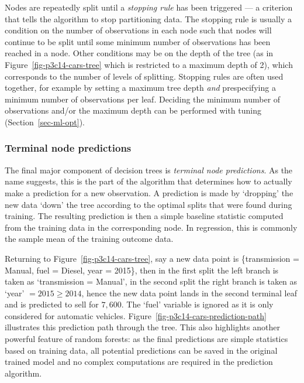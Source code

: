\documentclass[
  letterpaper,
  krantz2]{style/krantz}
\begin{document}
Nodes are repeatedly split until a \emph{stopping rule} has been
triggered --- a criterion that tells the algorithm to stop partitioning
data. The stopping rule is usually a
condition on the number of observations in each node such that nodes
will continue to be split until some minimum number of observations has
been reached in a node. Other conditions may be on the depth of the tree
(as in Figure~\ref{fig-p3c14-cars-tree} which is restricted to a maximum
depth of 2), which corresponds to the number of levels of
splitting. Stopping
rules are often used together, for example by setting a maximum tree
depth \emph{and} prespecifying a minimum number of observations per
leaf. Deciding the minimum number of observations and/or the maximum
depth can be performed with tuning (Section~\ref{sec-ml-opt}).

\subsubsection{Terminal node predictions}\label{sec-tree-terminal-nodes}

The final major component of decision trees is \emph{terminal node
predictions}. As the name suggests,
this is the part of the algorithm that determines how to actually make a
prediction for a new observation. A prediction is made by `dropping' the
new data `down' the tree according to the optimal splits that were found
during training. The resulting prediction is then a simple baseline
statistic computed from the training data in the corresponding node. In
regression, this is commonly the sample mean of the training outcome
data.

Returning to Figure~\ref{fig-p3c14-cars-tree}, say a new data point is
\{transmission = Manual, fuel = Diesel, year = 2015\}, then in the first
split the left branch is taken as `transmission = Manual', in the second
split the right branch is taken as `year' \(= 2015 \geq 2014\), hence
the new data point lands in the second terminal leaf and is predicted to
sell for \(7,600\). The `fuel' variable is ignored as it is only
considered for automatic vehicles.
Figure~\ref{fig-p3c14-cars-prediction-path} illustrates this prediction
path through the tree. This also highlights another powerful feature of
random forests: as the final predictions are simple statistics based on
training data, all potential predictions can be saved in the original
trained model and no complex computations are required in the prediction
algorithm.
\end{document}
